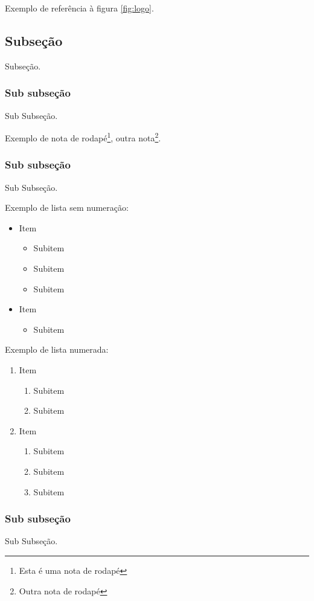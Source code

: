 \documentclass[11pt,a4paper]{article}
\begin{document}
Exemplo de referência à figura \ref{fig:logo}.

\subsection{Subseção}
Subseção.

\subsubsection{Sub subseção}
Sub Subseção.

Exemplo de nota de rodapé\footnote{Esta é uma nota de rodapé}, outra
nota\footnote{Outra nota de rodapé}.

\subsubsection{Sub subseção}
Sub Subseção.

Exemplo de lista sem numeração:
\begin{itemize}
 \item Item
  \begin{itemize}
   \item Subitem
   \item Subitem
   \item Subitem
  \end{itemize}
 \item Item
  \begin{itemize}
   \item Subitem
  \end{itemize}
\end{itemize}


\noindent %
Exemplo de lista numerada:
\begin{enumerate}
 \item Item
  \begin{enumerate}
   \item Subitem
   \item Subitem
  \end{enumerate}
 \item Item
  \begin{enumerate}
   \item Subitem
   \item Subitem
   \item Subitem
  \end{enumerate}
\end{enumerate}



\subsubsection{Sub subseção}
Sub Subseção.
\end{document}
